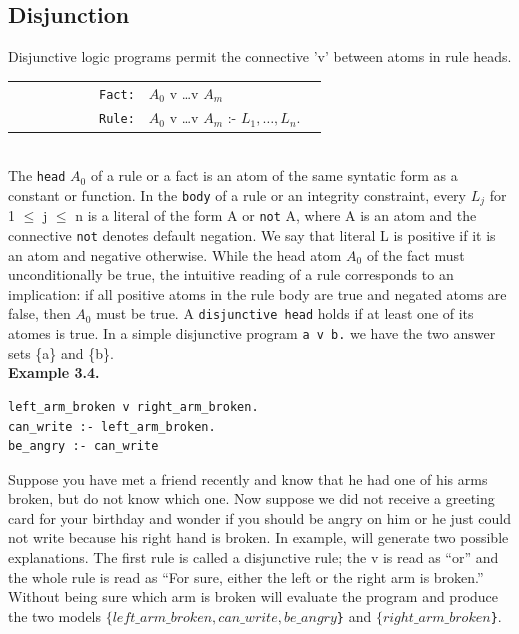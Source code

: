 \documentclass[14pt,a4paper, titlepage]{article}
\begin{document}
\subsection{Disjunction}
Disjunctive logic programs permit the connective 'v' between atoms in rule heads. \\
\begin{tabular}{ c c c c c c r l l}
 & & & & & & \texttt{Fact:} & $A_0$ v \dots v $A_m$ \\
 & & & & & & \texttt{Rule:} & $A_0$ v \dots v $A_m$ :- $L_1,\dots,L_n. $ \\
 \end{tabular}
\\ The \texttt{head} $A_0$ of a rule or a fact is an atom of the same syntatic form as a constant or function. In the \texttt{body} of a rule or an integrity constraint, every $L_j$ for 1 $\leq$ j $\leq$ n is a literal of the form A or \texttt{not} A, where A is an atom and the connective \texttt{not} denotes default negation. We say that literal L is positive if it is an atom and negative otherwise. While the head atom $A_0$ of the fact must unconditionally be true, the intuitive reading of a rule corresponds to an implication: if all positive atoms in the rule body are true and negated atoms are false, then $A_0$ must be true. A \texttt{disjunctive head} holds if at least one of its atomes is true. In a simple disjunctive program \texttt{a v b.} we have the two answer sets \{a\} and \{b\}.
\\ \textbf{Example 3.4.}
\begin{lstlisting}
left_arm_broken v right_arm_broken.
can_write :- left_arm_broken.
be_angry :- can_write
\end{lstlisting}
Suppose you have met a friend recently and know that he had one of his arms broken, but do not know which one. Now suppose we did not receive a greeting card for your birthday and wonder if you should be angry on him or he just could not write because his right hand is broken. In example, \dlvhex{} will generate two possible explanations. The first rule is called a disjunctive rule; the v is read as \enquote{or} and the whole rule is read as \enquote{For sure, either the left or the right arm is broken.} Without being sure which arm is broken \dlvhex{} will evaluate the program and produce the two models \texttt{$\{left\_arm\_broken, can\_write, be\_angry$\}} and \texttt{$\{right\_arm\_broken$\}}.  
\end{document}
